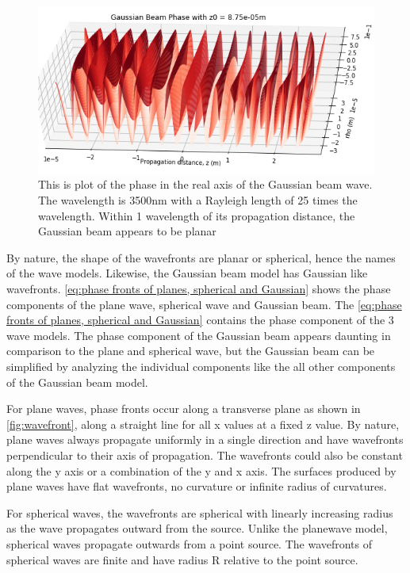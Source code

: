 \documentclass[11pt,a4paper]{book}
\begin{document}
		\begin{figure} 
		\centering
		\includegraphics[scale=0.8]{images/chapter-3/Gaussian_beam_phases1}
		\caption{This is plot of the phase in the real axis of the Gaussian beam wave. The wavelength is 3500nm with a Rayleigh length of 25 times the wavelength. Within 1 wavelength of its propagation distance, the Gaussian beam appears to be planar}
		\label{fig:Gaussian_beam_phase}
		\end{figure}
		By nature, the shape of the wavefronts are planar or spherical, hence the names of the wave models. Likewise, the Gaussian beam model has Gaussian like wavefronts. \autoref{eq:phase fronts of planes, spherical and Gaussian} shows the phase components of the plane wave, spherical wave and Gaussian beam. The \autoref{eq:phase fronts of planes, spherical and Gaussian} contains the phase component of the 3 wave models. The phase component of the Gaussian beam appears daunting in comparison to the plane and spherical wave, but the Gaussian beam can be simplified by analyzing the individual components like the all other components of the Gaussian beam model.
		
		For plane waves, phase fronts occur along a transverse plane as shown in \autoref{fig:wavefront}, along a straight line for all x values at a fixed z value. By nature, plane waves always propagate uniformly in a single direction and have wavefronts perpendicular to their axis of propagation. The wavefronts could also be constant along the y axis or a combination of the y and x axis. The surfaces produced by plane waves have flat wavefronts, no curvature or infinite radius of curvatures. 
		
		For spherical waves, the wavefronts are spherical with linearly increasing radius as the wave propagates outward from the source. Unlike the planewave model, spherical waves propagate outwards from a point source. The wavefronts of spherical waves are finite and have radius R relative to the point source.
		
\end{document}
